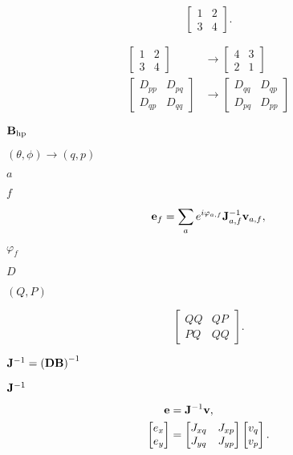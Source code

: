 \documentclass{article}
\begin{document}
\[ \begin{bmatrix} 1 & 2 \\ 3 & 4 \end{bmatrix}. \]
\pagebreak

\[ \begin{aligned} \begin{bmatrix} 1 & 2 \\ 3 & 4 \end{bmatrix} &\rightarrow \begin{bmatrix} 4 & 3 \\ 2 & 1 \end{bmatrix} \\ \begin{bmatrix} D_{pp} & D_{pq} \\ D_{qp} & D_{qq} \end{bmatrix} &\rightarrow \begin{bmatrix} D_{qq} & D_{qp} \\ D_{pq} & D_{pp} \end{bmatrix} \end{aligned} \]
\pagebreak

${\bf B}_\text{hp}$
\pagebreak

$(\theta,\phi)\rightarrow(q,p)$
\pagebreak

$a$
\pagebreak

$f$
\pagebreak

\[ {\bf e}_f = \sum_a e^{i\varphi_{a,f}} {\bf J}_{a,f}^{-1} {\bf v}_{a,f}, \]
\pagebreak

$\varphi_f$
\pagebreak

$D$
\pagebreak

$(Q,P)$
\pagebreak

\[\begin{bmatrix} QQ & QP \\ PQ & QQ \end{bmatrix}.\]
\pagebreak

${\bf J}^{-1} = \left({\bf D}{\bf B}\right)^{-1}$
\pagebreak

${\bf J}^{-1}$
\pagebreak

\[ \begin{aligned} {\bf e} &= {\bf J}^{-1} {\bf v}, \\ \begin{bmatrix} e_x \\ e_y \end{bmatrix} &= \begin{bmatrix} J_{xq} & J_{xp} \\ J_{yq} & J_{yp} \end{bmatrix} \begin{bmatrix} v_q \\ v_p \end{bmatrix}. \end{aligned} \]
\pagebreak
\end{document}
